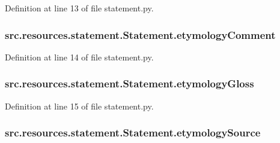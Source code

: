 Definition at line 13 of file statement.\+py.

\hypertarget{classsrc_1_1resources_1_1statement_1_1_statement_a2d906255b6faa8fdf058ce68b5f1b6ca}{
\subsubsection[{etymology\+Comment}]{\setlength{\rightskip}{0pt plus 5cm}src.\+resources.\+statement.\+Statement.\+etymology\+Comment}}\label{classsrc_1_1resources_1_1statement_1_1_statement_a2d906255b6faa8fdf058ce68b5f1b6ca}


Definition at line 14 of file statement.\+py.

\hypertarget{classsrc_1_1resources_1_1statement_1_1_statement_a9a25a5e6bbac5722c91a6d87026647d2}{
\subsubsection[{etymology\+Gloss}]{\setlength{\rightskip}{0pt plus 5cm}src.\+resources.\+statement.\+Statement.\+etymology\+Gloss}}\label{classsrc_1_1resources_1_1statement_1_1_statement_a9a25a5e6bbac5722c91a6d87026647d2}


Definition at line 15 of file statement.\+py.

\hypertarget{classsrc_1_1resources_1_1statement_1_1_statement_a161a06117936940080d5266f401711d9}{
\subsubsection[{etymology\+Source}]{\setlength{\rightskip}{0pt plus 5cm}src.\+resources.\+statement.\+Statement.\+etymology\+Source}}\label{classsrc_1_1resources_1_1statement_1_1_statement_a161a06117936940080d5266f401711d9}


